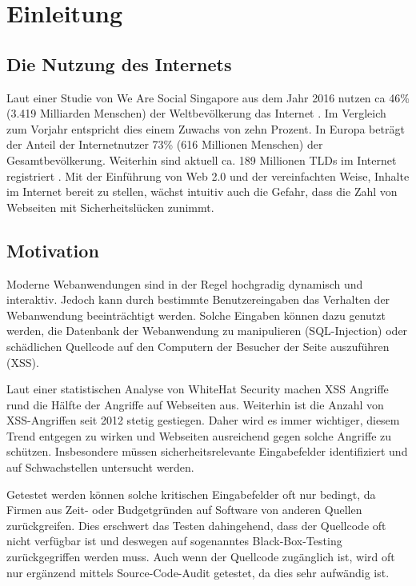 \chapter{Einleitung}\label{Einleitung}

\section{Die Nutzung des Internets}

Laut einer Studie von We Are Social Singapore aus dem Jahr 2016 nutzen ca 46\% (3.419 Milliarden Menschen) der Weltbevölkerung das Internet \cite{WeAreSocial2016}. Im Vergleich zum Vorjahr entspricht dies einem Zuwachs von zehn Prozent. In Europa beträgt der Anteil der Internetnutzer 73\% (616 Millionen Menschen) der Gesamtbevölkerung. Weiterhin sind aktuell ca. 189 Millionen \acp{TLD} im Internet registriert \cite{RegistrarStats2017}. Mit der Einführung von Web 2.0 und der vereinfachten Weise, Inhalte im Internet bereit zu stellen, wächst intuitiv auch die Gefahr, dass die Zahl von Webseiten mit Sicherheitslücken zunimmt.

\section{Motivation}
Moderne Webanwendungen sind in der Regel hochgradig dynamisch und interaktiv. Jedoch kann durch bestimmte Benutzereingaben das Verhalten der Webanwendung beeinträchtigt werden. Solche Eingaben können dazu genutzt werden, die Datenbank der Webanwendung zu manipulieren (SQL-Injection) oder schädlichen Quellcode auf den Computern der Besucher der Seite auszuführen (\gls{XSS}).

Laut einer statistischen Analyse von WhiteHat Security \cite{WhiteHatSecurity2016} machen \acl{XSS} Angriffe rund die Hälfte der Angriffe auf Webseiten aus. Weiterhin ist die Anzahl von \acl{XSS}-Angriffen seit 2012 stetig gestiegen. Daher wird es immer wichtiger, diesem Trend entgegen zu wirken und Webseiten ausreichend gegen solche Angriffe zu schützen. Insbesondere müssen sicherheitsrelevante Eingabefelder identifiziert und auf Schwachstellen untersucht werden.

Getestet werden können solche kritischen Eingabefelder oft nur bedingt, da Firmen aus Zeit- oder Budgetgründen auf Software von anderen Quellen zurückgreifen. Dies erschwert das Testen dahingehend, dass der Quellcode oft nicht verfügbar ist und deswegen auf sogenanntes Black-Box-Testing zurückgegriffen werden muss. Auch wenn der Quellcode zugänglich ist, wird oft nur ergänzend mittels Source-Code-Audit getestet, da dies sehr aufwändig ist.


